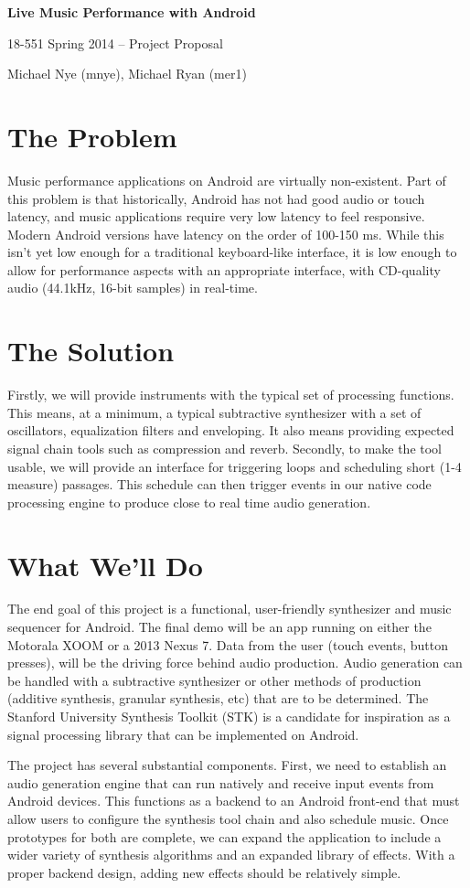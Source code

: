 \documentclass[letterpaper,12pt]{article}
\begin{document}
\begin{center}
    \par{\bf \LARGE Live Music Performance with Android}
    \par{\large 18-551 Spring 2014 -- Project Proposal}
    \par{\large Michael Nye (mnye), Michael Ryan (mer1)}
\end{center}


\section*{The Problem}
Music performance applications on Android are virtually non-existent. Part of
this problem is that historically, Android has not had good audio or touch
latency, and music applications require very low latency to feel responsive.
Modern Android versions have latency on the order of 100-150 ms. While this
isn't yet low enough for a traditional keyboard-like interface, it is low enough
to allow for performance aspects with an appropriate interface, with CD-quality
audio (44.1kHz, 16-bit samples) in real-time.


\section*{The Solution}
Firstly, we will provide instruments with the typical set of processing
functions. This means, at a minimum, a typical subtractive synthesizer with
a set of oscillators, equalization filters and enveloping. It also means
providing expected signal chain tools such as compression and reverb. Secondly,
to make the tool usable, we will provide an interface for triggering loops and
scheduling short (1-4 measure) passages. This schedule can then trigger events
in our native code processing engine to produce close to real time audio
generation.


\section*{What We'll Do}
The end goal of this project is a functional, user-friendly synthesizer and
music sequencer for Android. The final demo will be an app running on either the
Motorala XOOM or a 2013 Nexus 7. Data from the user (touch events, button
presses), will be the driving force behind audio production. Audio generation
can be handled with a subtractive synthesizer or other methods of production
(additive synthesis, granular synthesis, etc) that are to be determined. The
Stanford University Synthesis Toolkit (STK) is a candidate for inspiration as
a signal processing library that can be implemented on Android.

The project has several substantial components. First, we need to establish an
audio generation engine that can run natively and receive input events from
Android devices. This functions as a backend to an Android front-end that must
allow users to configure the synthesis tool chain and also schedule music. Once
prototypes for both are complete, we can expand the application to include
a wider variety of synthesis algorithms and an expanded library of effects. With
a proper backend design, adding new effects should be relatively simple.
\end{document}
